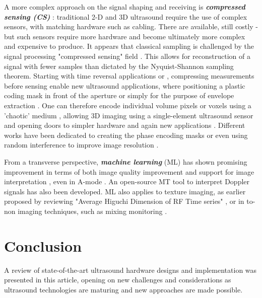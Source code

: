 \documentclass{article}
\begin{document}
A more complex approach on the signal shaping and receiving is \textbf{\textit{compressed sensing (CS)}} : traditional 2-D and 3D ultrasound require the use of complex sensors, with matching hardware such as cabling. There are available, still costly - but such sensors require more hardware and become ultimately more complex and expensive to produce. 
It appears that classical sampling is challenged by the signal processing "compressed sensing" field \cite{liutkus_imaging_2014,hua_compressed_2011}. This allows for reconstruction of a signal with fewer samples than dictated by the Nyquist-Shannon sampling theorem. Starting with time reversal applications \cite{montaldo_time_2004, montaldo_building_2005} or \cite{sarvazyan_comparative_2009}, compressing measurements before sensing enable new ultrasound applications, where positioning a plastic coding mask in front of the aperture \cite{fedjajevs_ultrasound_2016} or simply for the purpose of envelope extraction \cite{kim_signal-processing_2020}.  One can therefore encode individual volume pixels or voxels using a 'chaotic' medium  \cite{luong_compact_2016}, allowing 3D imaging using a single-element ultrasound sensor and opening doors to simpler hardware and again new applications \cite{kruizinga_compressive_2017}. Different works have been dedicated to creating the phase encoding masks \cite{van_der_meulen_spatial_2017} or even using random interference to improve image resolution \cite{ni_high-resolution_2020}.


From a transverse perspective, \textbf{\textit{machine learning}} (ML) has shown promising improvement in terms of both image quality improvement \cite{wang_high-resolution_2019, hewener_mobile_2019} and support for image interpretation \cite{divya_krishna_computer_2016}, even in A-mode \cite{brausch_classifying_2019}. An open-source MT tool to interpret Doppler signals \cite{dhutia_open-source_2017} has also been developed. ML also applies to texture imaging, as earlier proposed by reviewing "Average Higuchi Dimension of RF Time series" \cite{moradi_detection_2006}, or in to-non imaging techniques, such as mixing monitoring \cite{bowler_monitoring_2020}.


\newpage
\section{Conclusion}

A review of state-of-the-art ultrasound hardware designs and implementation was presented in this article, opening on new challenges and considerations as ultrasound technologies are maturing and new approaches are made possible.
\end{document}
